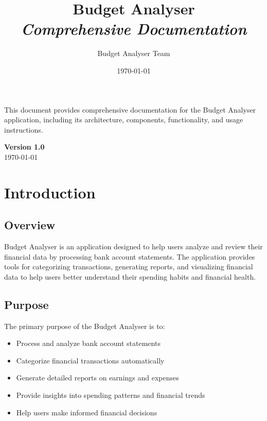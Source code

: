 \documentclass[11pt,a4paper]{report}
\title{
    \vspace{1cm}
    {\Huge\bfseries Budget Analyser}\\
    \vspace{0.5cm}
    {\large\textit{Comprehensive Documentation}}\\
    \vspace{2cm}
}
\author{Budget Analyser Team}
\date{\today}
\begin{document}
\begin{titlepage}
    \maketitle
    \begin{center}
        \vfill
        \begin{tcolorbox}[colback=primary!10,colframe=primary,width=0.8\textwidth]
            \centering
            \large This document provides comprehensive documentation for the Budget Analyser application, including its architecture, components, functionality, and usage instructions.
        \end{tcolorbox}
        \vfill
        \textbf{Version 1.0}\\
        \today
    \end{center}
\end{titlepage}

\tableofcontents

\chapter{Introduction}

\section{Overview}
Budget Analyser is an application designed to help users analyze and review their financial data by processing bank account statements. The application provides tools for categorizing transactions, generating reports, and visualizing financial data to help users better understand their spending habits and financial health.

\section{Purpose}
The primary purpose of the Budget Analyser is to:
\begin{itemize}
    \item Process and analyze bank account statements
    \item Categorize financial transactions automatically
    \item Generate detailed reports on earnings and expenses
    \item Provide insights into spending patterns and financial trends
    \item Help users make informed financial decisions
\end{itemize}
\end{document}
